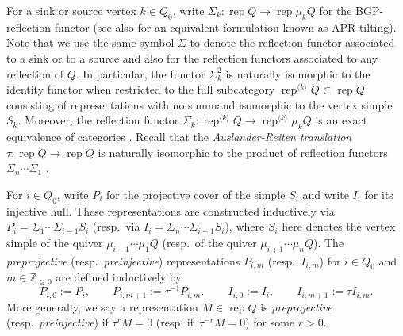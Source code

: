 \documentclass{amsart}
\newtheorem{lemma}[theorem]{Lemma}
\numberwithin{equation}{section}
\newcommand{\ZZ}{\mathbb{Z}}
\newcommand{\Hom}{\operatorname{Hom}}
\newcommand{\Irr}{\operatorname{Irr}}
\newcommand{\rep}{\operatorname{rep}}
\begin{document}
For a sink or source vertex $k\in Q_0$, write $\Sigma_k:\rep Q\to\rep \mu_k Q$ for the BGP-reflection functor \cite{BGP??} (see also \cite{APR??} for an equivalent formulation known as APR-tilting).
Note that we use the same symbol $\Sigma$ to denote the reflection functor associated to a sink or to a source and also for the reflection functors associated to any reflection of $Q$.
In particular, the functor $\Sigma_k^2$ is naturally isomorphic to the identity functor when restricted to the full subcategory $\rep^{\langle k\rangle} Q\subset\rep Q$ consisting of representations with no summand isomorphic to the vertex simple $S_k$.
Moreover, the reflection functor $\Sigma_k:\rep^{\langle k\rangle} Q\to\rep^{\langle k\rangle} \mu_k Q$ is an exact equivalence of categories \cite{DR76}.
Recall that the \emph{Auslander-Reiten translation} $\tau:\rep Q\to\rep Q$ is naturally isomorphic to the product of reflection functors $\Sigma_n\cdots\Sigma_1$ \cite{BB??}.

For $i\in Q_0$, write $P_i$ for the projective cover of the simple $S_i$ and write $I_i$ for its injective hull.
These representations are constructed inductively via $P_i=\Sigma_1\cdots\Sigma_{i-1}S_i$ (resp.~via $I_i=\Sigma_n\cdots\Sigma_{i+1}S_i$), where $S_i$ here denotes the vertex simple of the quiver $\mu_{i-1}\cdots\mu_1 Q$ (resp.~of the quiver $\mu_{i+1}\cdots\mu_n Q$).
The \emph{preprojective} (resp.~\emph{preinjective}) representations $P_{i,m}$ (resp.~$I_{i,m}$) for $i\in Q_0$ and $m\in\ZZ_{\ge0}$ are defined inductively by
\[
  P_{i,0}:=P_i,\qquad P_{i,m+1}:=\tau^{-1} P_{i,m},\qquad I_{i,0}:=I_i,\qquad I_{i,m+1}:=\tau I_{i,m}.
\]
More generally, we say a representation $M\in\rep Q$ is \emph{preprojective} (resp.~\emph{preinjective}) if $\tau^r M=0$ (resp. if~$\tau^{-r} M=0$) for some $r>0$.
\end{document}
